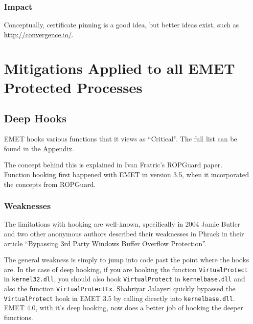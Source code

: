 \documentclass[]{article}
\begin{document}
\subsubsection{Impact}
Conceptually, certificate pinning is a good idea, but better ideas
exist, such as \url{http://convergence.io/}.


















\section{Mitigations Applied to all EMET Protected Processes}\label{mitigations-applied-to-all-emet-protected-processes}

\subsection{Deep Hooks}\label{deep-hooks}
EMET hooks various functions that it views as ``Critical''.  The full list can be found in the \hyperref[critical_functions]{Appendix}.

The concept behind this is explained in Ivan Fratric's ROPGuard paper\cite{ropguard_pdf}.  Function hooking first happened with EMET in version 3.5, when it incorporated the concepts from ROPGuard.

\subsubsection{Weaknesses}

The limitations with hooking are well-known, specifically in 2004 Jamie Butler and two other anonymous authors described their weaknesses in Phrack in their article ``Bypassing 3rd Party Windows Buffer Overflow Protection''\cite{bypass_overflow_protection}.  

The general weakness is simply to jump into code past the point where the hooks are.  In the case of deep hooking, if you are hooking the function \texttt{VirtualProtect} in \texttt{kernel32.dll}, you should also hook \texttt{VirtualProtect} in \texttt{kernelbase.dll} and also the function \texttt{VirtualProtectEx}.  Shahriyar Jalayeri quickly bypassed the \texttt{VirtualProtect} hook in EMET 3.5 by calling directly into \texttt{kernelbase.dll}\cite{emet35_rop_bypass}.  EMET 4.0, with it's deep hooking, now does a better job of hooking the deeper functions.
\end{document}
